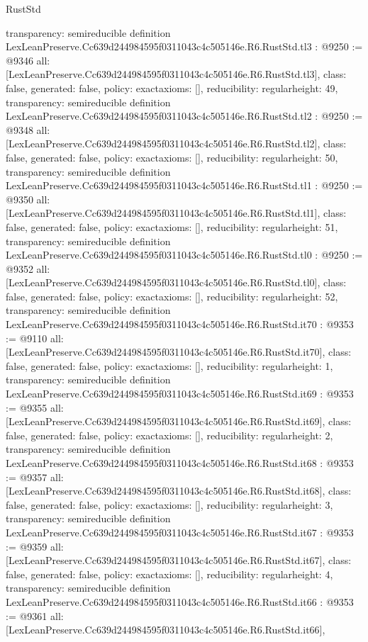 \begin{lexlean}{RustStd}
\begin{coremodule}
{  transparency: semireducible
}
definition LexLeanPreserve.Cc639d244984595f0311043c4c505146e.R6.RustStd.tl3 : @9250 := @9346 {
  all: [LexLeanPreserve.Cc639d244984595f0311043c4c505146e.R6.RustStd.tl3],
  class: false,
  generated: false,
  policy: exact{axioms: []},
  reducibility: regular{height: 49},
  transparency: semireducible
}
definition LexLeanPreserve.Cc639d244984595f0311043c4c505146e.R6.RustStd.tl2 : @9250 := @9348 {
  all: [LexLeanPreserve.Cc639d244984595f0311043c4c505146e.R6.RustStd.tl2],
  class: false,
  generated: false,
  policy: exact{axioms: []},
  reducibility: regular{height: 50},
  transparency: semireducible
}
definition LexLeanPreserve.Cc639d244984595f0311043c4c505146e.R6.RustStd.tl1 : @9250 := @9350 {
  all: [LexLeanPreserve.Cc639d244984595f0311043c4c505146e.R6.RustStd.tl1],
  class: false,
  generated: false,
  policy: exact{axioms: []},
  reducibility: regular{height: 51},
  transparency: semireducible
}
definition LexLeanPreserve.Cc639d244984595f0311043c4c505146e.R6.RustStd.tl0 : @9250 := @9352 {
  all: [LexLeanPreserve.Cc639d244984595f0311043c4c505146e.R6.RustStd.tl0],
  class: false,
  generated: false,
  policy: exact{axioms: []},
  reducibility: regular{height: 52},
  transparency: semireducible
}
definition LexLeanPreserve.Cc639d244984595f0311043c4c505146e.R6.RustStd.it70 : @9353 := @9110 {
  all: [LexLeanPreserve.Cc639d244984595f0311043c4c505146e.R6.RustStd.it70],
  class: false,
  generated: false,
  policy: exact{axioms: []},
  reducibility: regular{height: 1},
  transparency: semireducible
}
definition LexLeanPreserve.Cc639d244984595f0311043c4c505146e.R6.RustStd.it69 : @9353 := @9355 {
  all: [LexLeanPreserve.Cc639d244984595f0311043c4c505146e.R6.RustStd.it69],
  class: false,
  generated: false,
  policy: exact{axioms: []},
  reducibility: regular{height: 2},
  transparency: semireducible
}
definition LexLeanPreserve.Cc639d244984595f0311043c4c505146e.R6.RustStd.it68 : @9353 := @9357 {
  all: [LexLeanPreserve.Cc639d244984595f0311043c4c505146e.R6.RustStd.it68],
  class: false,
  generated: false,
  policy: exact{axioms: []},
  reducibility: regular{height: 3},
  transparency: semireducible
}
definition LexLeanPreserve.Cc639d244984595f0311043c4c505146e.R6.RustStd.it67 : @9353 := @9359 {
  all: [LexLeanPreserve.Cc639d244984595f0311043c4c505146e.R6.RustStd.it67],
  class: false,
  generated: false,
  policy: exact{axioms: []},
  reducibility: regular{height: 4},
  transparency: semireducible
}
definition LexLeanPreserve.Cc639d244984595f0311043c4c505146e.R6.RustStd.it66 : @9353 := @9361 {
  all: [LexLeanPreserve.Cc639d244984595f0311043c4c505146e.R6.RustStd.it66],
}
\end{coremodule}
\end{lexlean}
